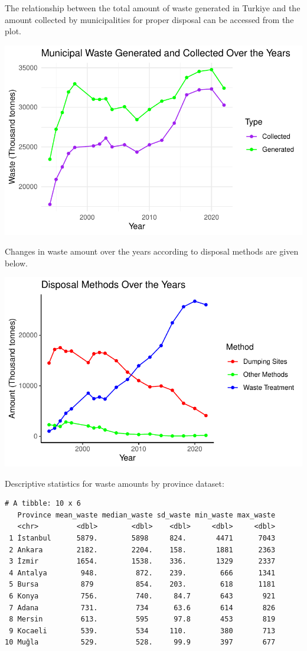 \documentclass[
  11pt,
  a4paper,
  DIV=11,
  numbers=noendperiod]{scrartcl}
\begin{document}
The relationship between the total amount of waste generated in Turkiye
and the amount collected by municipalities for proper disposal can be
accessed from the plot.

\includegraphics{project_files/figure-pdf/unnamed-chunk-22-1.pdf}

Changes in waste amount over the years according to disposal methods are
given below.

\includegraphics{project_files/figure-pdf/unnamed-chunk-23-1.pdf}

Descriptive statistics for waste amounts by province dataset:

\begin{verbatim}
# A tibble: 10 x 6
   Province mean_waste median_waste sd_waste min_waste max_waste
   <chr>         <dbl>        <dbl>    <dbl>     <dbl>     <dbl>
 1 İstanbul      5879.        5898     824.       4471      7043
 2 Ankara        2182.        2204.    158.       1881      2363
 3 İzmir         1654.        1538.    336.       1329      2337
 4 Antalya        948.         872.    239.        666      1341
 5 Bursa          879          854.    203.        618      1181
 6 Konya          756.         740.     84.7       643       921
 7 Adana          731.         734      63.6       614       826
 8 Mersin         613.         595      97.8       453       819
 9 Kocaeli        539.         534     110.        380       713
10 Muğla          529.         528.     99.9       397       677
\end{verbatim}
\end{document}
